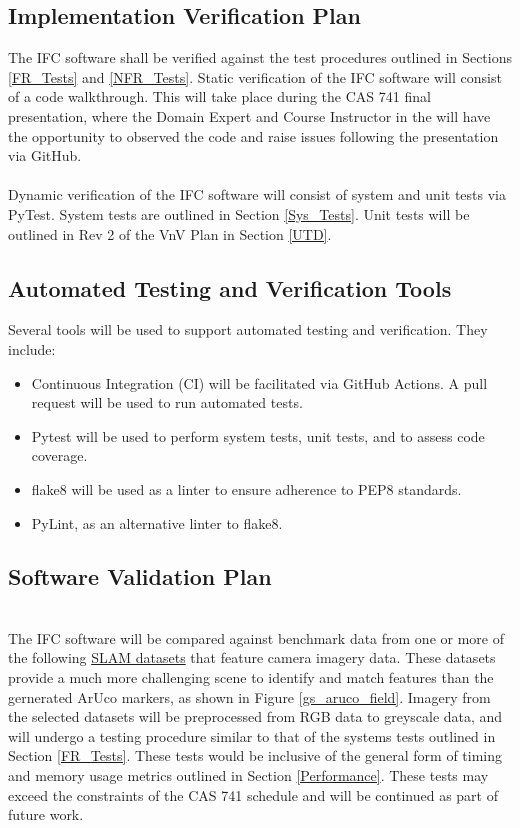 \documentclass[12pt, titlepage]{article}
\begin{document}
\subsection{Implementation Verification Plan}
The IFC software shall be verified against the test procedures outlined in Sections \ref{FR_Tests} and 
\ref{NFR_Tests}. Static verification of the IFC software will consist of a code walkthrough. This will take 
place during the CAS 741 final presentation, where the Domain Expert and Course Instructor in the 
will have the opportunity to observed the code and raise issues following the presentation via GitHub. \\ \\
Dynamic  verification of the IFC software will consist of system and unit tests via PyTest. System tests 
are outlined in Section \ref{Sys_Tests}. Unit tests will be outlined in Rev 2 of the VnV Plan in 
Section \ref{UTD}.

\subsection{Automated Testing and Verification Tools}
Several tools will be used to support automated testing and verification. They include:
\begin{itemize}
\item Continuous Integration (CI) will be facilitated via GitHub Actions. A pull request will be used 
to run automated tests.
\item Pytest will be used to perform system tests, unit tests, and to assess code coverage. 
\item flake8 will be used as a linter to ensure adherence to PEP8 standards. 
\item PyLint, as an alternative linter to flake8.
\end{itemize}

\subsection{Software Validation Plan}
\\

The IFC software will be compared against benchmark data from one or more of the following 
\href{https://github.com/youngguncho/awesome-slam-datasets}{SLAM datasets} that feature camera imagery data. 
These datasets provide a much more challenging scene to identify and match features than the gernerated 
ArUco markers, as shown in Figure \ref{gs_aruco_field}. Imagery from the selected datasets will be preprocessed 
from RGB data to greyscale data, and will undergo a testing procedure similar to that of the systems tests 
outlined in Section \ref{FR_Tests}. These tests would be inclusive of the general form of timing and memory 
usage  metrics outlined in Section \ref{Performance}. These tests may exceed the constraints of the  CAS 
741 schedule and will be continued as part of future work.
\end{document}
